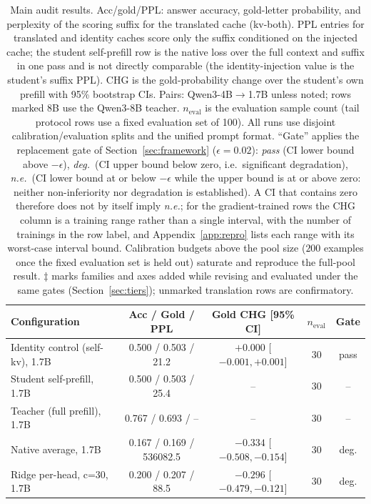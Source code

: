 \documentclass[10pt]{article}
\begin{document}
\begin{table}[t]
\centering
\caption{Main audit results. Acc/gold/PPL: answer accuracy,
gold-letter probability, and perplexity of the scoring suffix for
the translated cache (kv-both). PPL entries for translated and identity
caches score only the suffix conditioned on the injected cache; the student
self-prefill row is the native loss over the full context and suffix in one
pass and is not directly comparable (the identity-injection value is the
student's suffix PPL). CHG is the gold-probability change
over the student's own prefill with 95\% bootstrap CIs. Pairs:
Qwen3-4B$\to$1.7B unless noted; rows marked 8B use the Qwen3-8B
teacher. $n_{\mathrm{eval}}$ is the evaluation sample count (tail
protocol rows use a fixed evaluation set of 100). All runs use
disjoint calibration/evaluation splits and the unified prompt
format. ``Gate'' applies the replacement gate of
Section~\ref{sec:framework} ($\epsilon{=}0.02$): \emph{pass} (CI lower bound
above $-\epsilon$), \emph{deg.}\ (CI upper bound below zero, i.e.\ significant
degradation), \emph{n.e.}\ (CI lower bound at or below $-\epsilon$ while the
upper bound is at or above zero: neither non-inferiority nor degradation is
established). A CI that contains zero therefore does not by itself imply
\emph{n.e.}; for the gradient-trained rows the CHG column is a training range
rather than a single interval, with the number of trainings in the row label,
and Appendix~\ref{app:repro} lists each range with its worst-case interval
bound. Calibration budgets above the pool size ($200$
examples once the fixed evaluation set is held out) saturate and reproduce the
full-pool result.
$\ddagger$ marks families and axes added while revising and evaluated under the
same gates (Section~\ref{sec:tiers}); unmarked translation rows are
confirmatory.}
\label{tab:main}
\footnotesize
\setlength{\tabcolsep}{4pt}
\begin{tabular}{lcccc}
\toprule
Configuration & Acc / Gold / PPL & Gold CHG [95\% CI] & $n_{\mathrm{eval}}$ & Gate \\
\midrule
Identity control (self-kv), 1.7B & 0.500 / 0.503 / 21.2 & $+0.000$ [$-0.001, +0.001$] & 30 & pass \\
Student self-prefill, 1.7B & 0.500 / 0.503 / 25.4 & -- & 30 & -- \\
Teacher (full prefill), 1.7B & 0.767 / 0.693 / -- & -- & 30 & -- \\
Native average, 1.7B & 0.167 / 0.169 / 536082.5 & $-0.334$ [$-0.508, -0.154$] & 30 & deg. \\
Ridge per-head, c=30, 1.7B & 0.200 / 0.207 / 88.5 & $-0.296$ [$-0.479, -0.121$] & 30 & deg. \\

\end{tabular}
\end{table}
\end{document}
